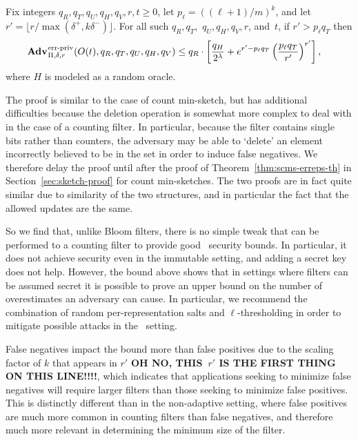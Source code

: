 \begin{theorem}\label{thm:counting-erreps}
Fix integers $q_R,q_T,q_U,q_H,q_V, r, t \geq 0$, let $p_\ell = ((\ell+1)/m)^k$,
and let
$r' = \lfloor r/\max(\delta^+,k\delta^-) \rfloor$. For all such
$q_R,q_T,$ $q_U,q_H,q_V,r$, and~$t$, if $r' > p_\ell q_T$ then
  \begin{equation*}
  \begin{aligned}
   \Adv{\erreps}_{\Pi,\delta,r}(O(t),\,&q_R,q_T,q_U,q_H,q_V) \leq q_R \cdot \left[\frac{q_H}{2^\lambda} + e^{r'-p_\ell q_T}\left(\frac{p_\ell q_T}{r'}\right)^{r'}\right],
  \end{aligned}
\end{equation*}
where $H$ is modeled as a random oracle.
\end{theorem}
The proof is similar to the case of count min-sketch, but has additional
difficulties because the deletion operation is somewhat more complex to deal
with in the case of a counting filter. In particular, because the filter contains
single bits rather than counters, the adversary may be able
to `delete' an element incorrectly believed to be in the set in order to induce
false negatives. We therefore delay the proof until after the proof
of Theorem~\ref{thm:scms-erreps-th} in Section~\ref{sec:sketch-proof} for count min-sketches. The two proofs are
in fact quite similar due to similarity of the two structures, and in particular
the fact that the allowed updates are the same.

So we find that, unlike Bloom filters, there is no simple tweak that can be performed
to a counting filter to provide good \errep\ security bounds. In particular, it
does not achieve security even in the immutable setting, and adding a secret key
does not help.
%
However, the bound above shows that in settings where filters can be assumed
secret it is possible to prove an upper bound on the number of overestimates an
adversary can cause. In particular, we recommend the combination of random
per-representation salts and $\ell$-thresholding in order to mitigate possible
attacks in the \erreps\ setting.

False negatives impact the bound more
than false positives due to the scaling factor of $k$ that appears in $r'$
{\bf\color{red} OH NO, THIS~$r'$ IS THE FIRST THING ON THIS LINE!!!!},
which indicates that applications seeking to minimize false negatives will
require larger filters than those seeking to minimize false positives. This is
distinctly different than in the non-adaptive setting, where false positives are
much more common in counting filters than false negatives, and therefore much
more relevant in determining the minimum size of the filter.
